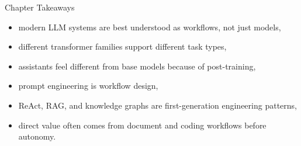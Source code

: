 \documentclass[12pt]{beamer}
\begin{document}
\begin{frame}{Chapter Takeaways}
  \begin{itemize}
    \item modern LLM systems are best understood as workflows, not just models,
    \item different transformer families support different task types,
    \item assistants feel different from base models because of post-training,
    \item prompt engineering is workflow design,
    \item ReAct, RAG, and knowledge graphs are first-generation engineering patterns,
    \item direct value often comes from document and coding workflows before autonomy.
  \end{itemize}
\end{frame}
\end{document}

